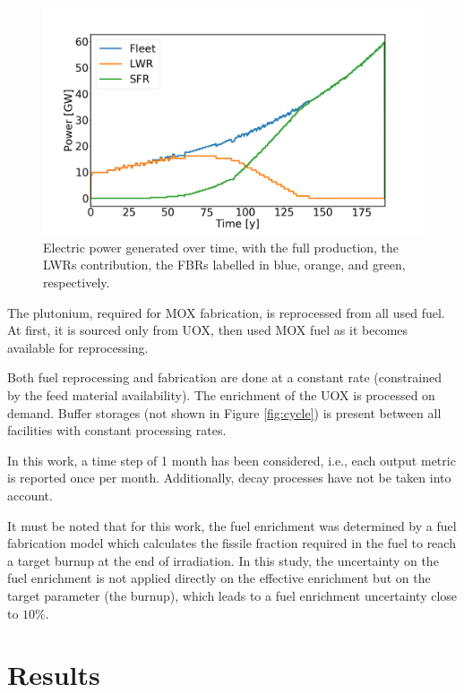\documentclass{anstrans}
\begin{document}
\begin{figure}[ht] %
    \centering
    \includegraphics[scale=0.18]{power.png}
    \caption{Electric power generated over time, with the full production,
        the \glspl{LWR} contribution, the \glspl{FBR} labelled in blue, orange, and green, respectively.}
    \label{fig:power}
\end{figure}


The plutonium, required for \gls{MOX} fabrication, is reprocessed from all
used fuel.  At first, it is sourced only from \gls{UOX}, then used \gls{MOX} fuel
as it becomes available for reprocessing.

Both fuel reprocessing and fabrication are done at a constant rate (constrained
by the feed material availability).  The enrichment of the \gls{UOX} is processed
on demand.  Buffer storages (not shown in Figure \ref{fig:cycle}) is present
between all facilities with constant processing rates.

In this work, a time step of 1 month has been considered, i.e., each output
metric is reported once per month. Additionally, decay processes have not be taken into
account.

It must be noted that for this work, the fuel enrichment was determined by a
fuel fabrication model\cite{Leniau2015125} which
calculates the fissile fraction required in the fuel to reach a target
burnup at the end of irradiation.  In this study, the uncertainty on the fuel
enrichment is not applied directly on the effective enrichment but on the target
parameter (the burnup), which leads to a fuel enrichment uncertainty close to
$10\%$.

\section{Results}
\end{document}
